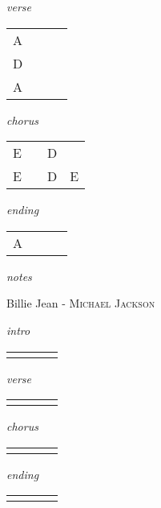\documentclass[12pt]{article}
\begin{document}
\textit{verse}

\begin{tabular}{|P{1.25in}|P{1.25in}|P{1.25in}|P{1.25in}|}
  A &   &   &   \\
  D &   &   &   \\
  A &   &   &   \\
\end{tabular}

\textit{chorus}

\begin{tabular}{|P{1.25in}|P{1.25in}|P{1.25in}|P{1.25in}|}
  E &   & D &   \\
  E &   & D & E \\
\end{tabular}

\textit{ending}

\begin{tabular}{|P{1.25in}|P{1.25in}|P{1.25in}|P{1.25in}|}
  A &   &   &   \\
\end{tabular}

\textit{notes}

\newpage

{\Huge Billie Jean} {\huge - \textsc{Michael Jackson}}

\huge
\textit{intro}

\begin{tabular}{|P{1.25in}|P{1.25in}|P{1.25in}|P{1.25in}|}
   &   &   &   \\
\end{tabular}

\textit{verse}

\begin{tabular}{|P{1.25in}|P{1.25in}|P{1.25in}|P{1.25in}|}
    &   &   &   \\
\end{tabular}

\textit{chorus}

\begin{tabular}{|P{1.25in}|P{1.25in}|P{1.25in}|P{1.25in}|}
    &   &   &   \\
\end{tabular}

\textit{ending}

\begin{tabular}{|P{1.25in}|P{1.25in}|P{1.25in}|P{1.25in}|}
    &   &   &   \\
\end{tabular}
\end{document}
